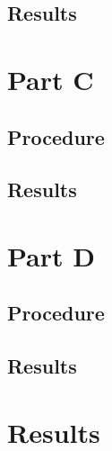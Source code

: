 \documentclass[a4paper,11pt]{article}
\begin{document}
\subsection{Results}

\section{Part C}
\subsection{Procedure}
\subsection{Results}

\section{Part D}
\subsection{Procedure}
\subsection{Results}
\section{Results}
\end{document}
